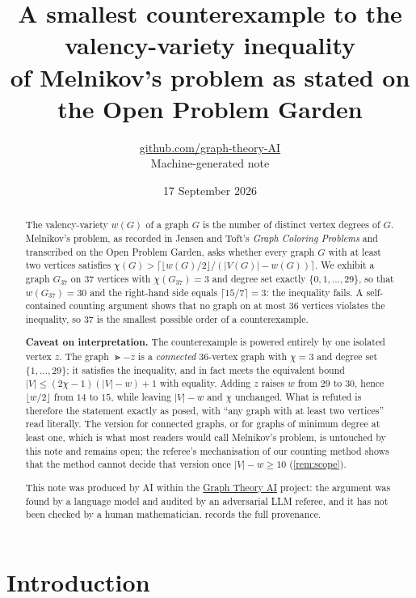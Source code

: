 \documentclass[11pt,a4paper]{article}
\title{A smallest counterexample to the valency-variety inequality\\ of Melnikov's problem as stated on the Open Problem Garden}
\author{\href{https://github.com/graph-theory-AI}{github.com/graph-theory-AI}\\[2pt] \normalsize Machine-generated note}
\date{17 September 2026}
\theoremstyle{plain}
\theoremstyle{definition}
\theoremstyle{remark}
\newcommand{\Gcounter}{G_{37}}
\newcommand{\fl}[1]{\lfloor #1\rfloor}
\newcommand{\ce}[1]{\lceil #1\rceil}
\begin{document}
\maketitle

\begin{abstract}
The valency-variety $w(G)$ of a graph $G$ is the number of distinct vertex degrees of $G$. Melnikov's problem, as recorded in Jensen and Toft's \emph{Graph Coloring Problems} and transcribed on the Open Problem Garden, asks whether every graph $G$ with at least two vertices satisfies $\chi(G)>\bigl\lceil \fl{w(G)/2}/(|V(G)|-w(G))\bigr\rceil$. We exhibit a graph $\Gcounter$ on $37$ vertices with $\chi(\Gcounter)=3$ and degree set exactly $\{0,1,\dots,29\}$, so that $w(\Gcounter)=30$ and the right-hand side equals $\ce{15/7}=3$: the inequality fails. A self-contained counting argument shows that no graph on at most $36$ vertices violates the inequality, so $37$ is the smallest possible order of a counterexample.

\smallskip\noindent
\textbf{Caveat on interpretation.} The counterexample is powered entirely by one isolated vertex $z$. The graph $\Gt-z$ is a \emph{connected} $36$-vertex graph with $\chi=3$ and degree set $\{1,\dots,29\}$; it satisfies the inequality, and in fact meets the equivalent bound $|V|\le(2\chi-1)(|V|-w)+1$ with equality. Adding $z$ raises $w$ from $29$ to $30$, hence $\fl{w/2}$ from $14$ to $15$, while leaving $|V|-w$ and $\chi$ unchanged. What is refuted is therefore the statement exactly as posed, with ``any graph with at least two vertices'' read literally. The version for connected graphs, or for graphs of minimum degree at least one, which is what most readers would call Melnikov's problem, is untouched by this note and remains open; the referee's mechanisation of our counting method shows that the method cannot decide that version once $|V|-w\ge10$ (\cref{rem:scope}).

\medskip\noindent\small
This note was produced by AI within the \href{https://github.com/graph-theory-AI/Graph-Theory-LLM-Proofs}{Graph Theory AI} project:
the argument was found by a language model and audited by an adversarial LLM
referee, and it has not been checked by a human mathematician.
 records the full provenance.
\end{abstract}

\section{Introduction}
\end{document}
